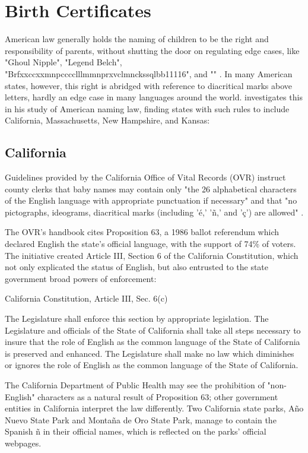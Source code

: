 \section{Birth Certificates}

American law generally holds the naming of children to be the right and
responsibility of parents, without shutting the door on regulating edge cases,
like "Ghoul Nipple", "Legend Belch",
"Brfxxccxxmnpcccclllmmnprxvclmnckssqlbb11116", and "" \parencite{larson11}. In
many American states, however, this right is abridged with reference to
diacritical marks above letters, hardly an edge case in many languages around
the world. \textcite[5]{larson11} investigates this in his study of American naming
law, finding states with such rules to include California, Massachusetts, New
Hampshire, and Kansas:

\subsection{California}

Guidelines provided by the California Office of Vital Records (OVR) instruct
county clerks that baby names may contain only "the 26 alphabetical characters
of the English language with appropriate punctuation if necessary" and that "no
pictographs, ideograms, diacritical marks (including 'é,' 'ñ,' and 'ç') are
allowed" \parencite{larson11}.

The OVR's handbook cites Proposition 63, a 1986 ballot referendum which declared
English the state's official language, with the support of 74\% of voters. The
initiative created Article III, Section 6 of the California Constitution, which
not only explicated the status of English, but also entrusted to the state
government broad powers of enforcement: 

\begin{aquote}{California Constitution, Article III, Sec. 6(c)}

The Legislature shall enforce this section by appropriate legislation. The
Legislature and officials of the State of California shall take all steps
necessary to insure that the role of English as the common language of the State
of California is preserved and enhanced. The Legislature shall make no law which
diminishes or ignores the role of English as the common language of the State of
California.

\end{aquote}

The California Department of Public Health may see the prohibition of
"non-English" characters as a natural result of Proposition 63; other government
entities in California interpret the law differently. Two California state
parks, Año Nuevo State Park and Montaña de Oro State Park, manage to contain the
Spanish ñ in their official names, which is reflected on the parks' official
webpages. \parencite{año-nuevo} \parencite{montaña-de-oro}

